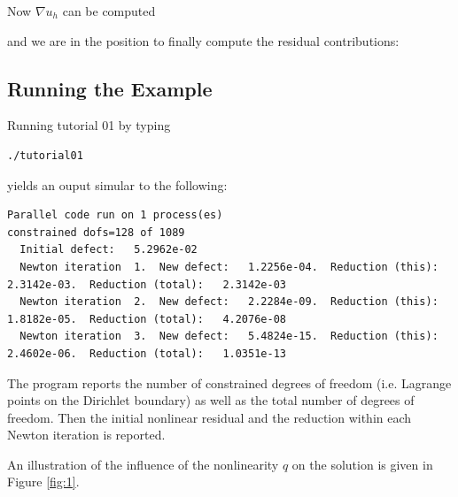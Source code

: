 \documentclass[a4paper,12pt]{article}
\begin{document}
Now $\nabla u_h$ can be computed

and we are in the position to finally compute the residual contributions:


\subsection{Running the Example}

Running tutorial 01 by typing
\begin{lstlisting}[basicstyle=\ttfamily\small,
frame=single,
backgroundcolor=\color{listingbg}]
./tutorial01
\end{lstlisting}
yields an ouput simular to the following:
\begin{lstlisting}[basicstyle=\ttfamily\tiny,
frame=single,
backgroundcolor=\color{listingbg}]
Parallel code run on 1 process(es)
constrained dofs=128 of 1089
  Initial defect:   5.2962e-02
  Newton iteration  1.  New defect:   1.2256e-04.  Reduction (this):   2.3142e-03.  Reduction (total):   2.3142e-03
  Newton iteration  2.  New defect:   2.2284e-09.  Reduction (this):   1.8182e-05.  Reduction (total):   4.2076e-08
  Newton iteration  3.  New defect:   5.4824e-15.  Reduction (this):   2.4602e-06.  Reduction (total):   1.0351e-13
\end{lstlisting}
The program reports the number of constrained degrees of freedom
(i.e. Lagrange points on the Dirichlet boundary) as well as the total number of degrees of freedom.
Then the initial nonlinear residual and the reduction within each Newton iteration is reported.

An illustration of the influence of the nonlinearity $q$ on the solution is given in 
Figure \ref{fig:1}.
\end{document}
